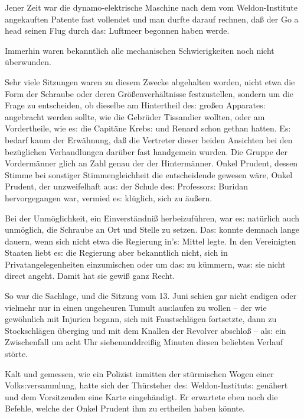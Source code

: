 \documentclass[oneside,12pt]{book}
\newenvironment{antiqua}{\normalfont}{}
\newcommand{\s}{s:}
\begin{document}
Jener Zeit war die dynamo-elektrische Maschine nach dem vom
Weldon-Institute angekauften Patente fast vollendet und man durfte
darauf rechnen, da{\ss} der \begin{antiqua}Go a head\end{antiqua} 
seinen Flug durch da{\s} Luftmeer begonnen haben werde.

Immerhin waren bekanntlich alle mechanischen Schwierigkeiten noch
nicht \"uberwunden.

Sehr viele Sitzungen waren zu diesem Zwecke abgehalten worden, nicht
etwa die Form der Schraube oder deren Gr\"o{\ss}enverh\"altnisse
fest\/zustellen, sondern um die Frage zu entscheiden, ob dieselbe am
Hintertheil de{\s} gro{\ss}en Apparate{\s} angebracht werden sollte,
wie die Gebr\"uder Tissandier wollten, oder am Vordertheile, wie
e{\s} die Capit\"ane Kreb{\s} und Renard schon gethan hatten. E{\s}
bedarf kaum der Erw\"ahnung, da{\ss} die Vertreter dieser beiden
Ansichten bei den bez\"uglichen Verhandlungen dar\"uber fast
handgemein wurden. Die Gruppe der {\glqq}Vorderm\"anner{\grqq} glich
an Zahl genau der der {\glqq}Hinterm\"anner{\grqq}. Onkel Prudent,
dessen Stimme bei sonstiger Stimmengleichheit die entscheidende
gewesen w\"are, Onkel Prudent, der unzweifelhaft au{\s} der Schule
de{\s} Professor{\s} Buridan hervorgegangen war, vermied e{\s}
kl\"uglich, sich zu \"au{\ss}ern.

Bei der Unm\"oglichkeit, ein Einverst\"andni{\ss} herbeizuf\"uhren,
war e{\s} nat\"urlich auch unm\"oglich, die Schraube an Ort und
Stelle zu setzen. Da{\s} konnte demnach lange dauern, wenn sich nicht
etwa die Regierung in'{\s} Mittel legte. In den Vereinigten Staaten
liebt e{\s} die Regierung aber bekanntlich nicht, sich in
Privatangelegenheiten einzumischen oder um da{\s} zu k\"ummern,
wa{\s} sie nicht direct angeht. Damit hat sie gewi{\ss} ganz Recht.

So war die Sachlage, und die Sitzung vom 13. Juni schien gar nicht
endigen oder vielmehr nur in einen ungeheuren Tumult au{\s}laufen zu
wollen -- der wie gew\"ohnlich mit Injurien begann, sich mit
Faustschl\"agen fortsetzte, dann zu Stockschl\"agen \"uberging und
mit dem Knallen der Revolver abschlo{\ss} -- al{\s} ein Zwischenfall
um acht Uhr siebenunddrei{\ss}ig Minuten diesen beliebten Verlauf
st\"orte.

Kalt und gemessen, wie ein Polizist inmitten der st\"urmischen Wogen
einer Volk{\s}versammlung, hatte sich der Th\"ursteher de{\s}
Weldon-Institut{\s} gen\"ahert und dem Vorsitzenden eine Karte
eingeh\"andigt. Er erwartete eben noch die Befehle, welche der Onkel
Prudent ihm zu ertheilen haben k\"onnte.
\end{document}
